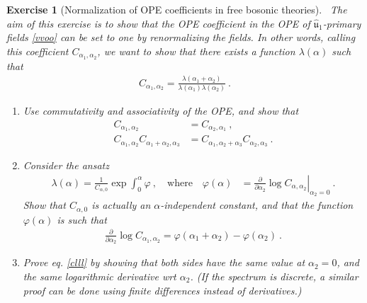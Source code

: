 \documentclass[12pt, a4paper, notitlepage, twoside]{report}
\numberwithin{equation}{section}
\theoremstyle{break}
\newtheorem{exo}{Exercise}[chapter]
\begin{document}
\begin{exo}[Normalization of OPE coefficients in free bosonic theories]
 ~\label{exoone}
The aim of this exercise is to show that the OPE coefficient in the OPE of $\hat{\mathfrak{u}}_1$-primary fields \eqref{vvoo} can be set to one by renormalizing the fields.
In other words, calling this coefficient $C_{\alpha_1,\alpha_2}$, we want to show that there exists a function $\lambda(\alpha)$ such that 
\begin{align}
 C_{\alpha_1,\alpha_2} = \frac{\lambda(\alpha_1+\alpha_2)}{\lambda(\alpha_1)\lambda(\alpha_2)}\ .
\label{clll}
\end{align}
\begin{enumerate}
 \item Use commutativity and associativity of the OPE, and show that 
\begin{align}
C_{\alpha_1,\alpha_2} &= C_{\alpha_2,\alpha_1}\ ,
\\
 C_{\alpha_1,\alpha_2}C_{\alpha_1+\alpha_2,\alpha_3} &= C_{\alpha_1,\alpha_2+\alpha_3}C_{\alpha_2,\alpha_3}\ .
\end{align}

\item Consider the ansatz
\begin{align}
  \lambda(\alpha) = \frac{1}{C_{\alpha,0}} \exp \int_0^{\alpha} \varphi \ , \quad \text{where}\quad  
 \varphi(\alpha)&=\left.{\frac{\partial}{\partial \alpha_2}}\log C_{\alpha,\alpha_2}\right|_{\alpha_2=0}\ .
\end{align}
Show that $C_{\alpha,0}$ is actually an $\alpha$-independent constant, and that the function $\varphi(\alpha)$ is such that
\begin{align}
 {\frac{\partial}{\partial \alpha_2}} \log C_{\alpha_1,\alpha_2}  = \varphi(\alpha_1+\alpha_2)-\varphi(\alpha_2)\ . 
\end{align}

\item
Prove eq. \eqref{clll} by showing that both sides have the same value at $\alpha_2=0$, and the same logarithmic derivative wrt $\alpha_2$. 
(If the spectrum is discrete, a similar proof can be done using finite differences instead of derivatives.) 
\end{enumerate}
\end{exo}
\end{document}
